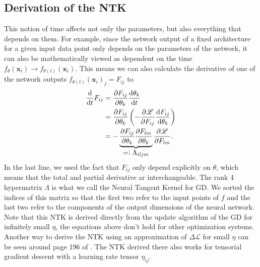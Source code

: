 \subsection{Derivation of the NTK}
This notion of time affects not only the parameters, but also everything that depends on them. For example, since the network output of a fixed architecture for a given input data point only depends on the parameters of the network, it can also be mathematically viewed as dependent on the time $f_{\theta}(\mathbf{x}_i) \rightarrow f_{\theta(t)}(\mathbf{x}_i)$. This means we can also calculate the derivative of one of the network outputs $f_{\theta(t)}(\mathbf{x}_i)_j = F_{ij}$ to
\begin{align}
	\tAbl{}{t} F_{ij} &= \pAbl{F_{ij}}{\theta_k}\tAbl{\theta_k}{t}\nonumber\\
	&= \pAbl{F_{ij}}{\theta_k} \left(- \pAbl{\mathscr{L}}{F_{ij}} \tAbl{F_{ij}}{\theta_k} \right)\label{eq:NTKarisesFromHere}\\
	&= - \underbrace{\pAbl{F_{ij}}{\theta_k} \pAbl{F_{lm}}{\theta_k}}_\mathlarger{=\vcentcolon \Lambda_{iljm}}
	\pAbl{\mathscr{L}}{F_{lm}}.\nonumber
\end{align}
In the last line, we used the fact that $F_{ij}$ only depend explicitly on $\theta$, which means that the total and partial derivative ar interchangeable.
The rank 4 hypermatrix $\Lambda$ is what we call the Neural Tangent Kernel for GD. We sorted the indices of this matrix so that the first two refer to the input points of $f$ and the last two refer to the components of the output dimensions of the neural network. Note that this NTK is derived directly from the update algorithm of the GD for infinitely small $\eta$, the equations above don't hold for other optimization systems.\\
Another way to derive the NTK using an approximation of $\Delta \mathscr{L}$ for small $\eta$ can be seen around page 196 of \cite{ThePrinciplesOfDeepLearningTheory}. The NTK derived there also works for tensorial gradient descent with a learning rate tensor $\eta_{ij}$.